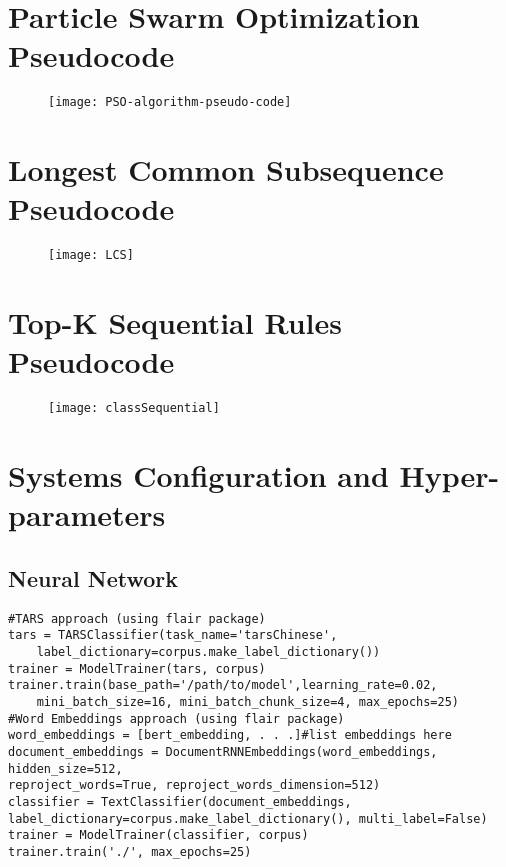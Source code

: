 \documentclass [11pt, proquest] {uwthesis}[2020/02/24]
\begin{document}
\chapter{Particle Swarm Optimization Pseudocode}
\begin{figure}[hbt!]
\begin{center}
\texttt{[image: PSO-algorithm-pseudo-code]}
\end{center}
\end{figure}
\cite{hudaib2017movement}


\chapter{Longest Common Subsequence Pseudocode}
\begin{figure}[hbt!]
\begin{center}
\texttt{[image: LCS]}
\end{center}
\end{figure}
\cite{Cormen2009}


\chapter{Top-K Sequential Rules Pseudocode}
\begin{figure}[hbt!]
\begin{center}
\texttt{[image: classSequential]}
\end{center}
\end{figure}
\cite{Fournier-Viger2011}

\chapter{Systems Configuration and Hyper-parameters}
\section{Neural Network}
\begin{verbatim}
#TARS approach (using flair package)
tars = TARSClassifier(task_name='tarsChinese',
	label_dictionary=corpus.make_label_dictionary())
trainer = ModelTrainer(tars, corpus)
trainer.train(base_path='/path/to/model',learning_rate=0.02,
	mini_batch_size=16, mini_batch_chunk_size=4, max_epochs=25)
#Word Embeddings approach (using flair package)
word_embeddings = [bert_embedding, . . .]#list embeddings here
document_embeddings = DocumentRNNEmbeddings(word_embeddings, hidden_size=512,
reproject_words=True, reproject_words_dimension=512)
classifier = TextClassifier(document_embeddings,
label_dictionary=corpus.make_label_dictionary(), multi_label=False)
trainer = ModelTrainer(classifier, corpus)
trainer.train('./', max_epochs=25)
\end{verbatim}
\end{document}
